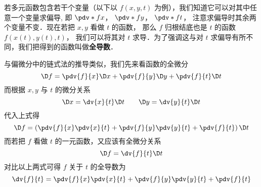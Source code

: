 
若多元函数包含若干个变量（以下以 $f(x,y,t)$ 为例），我们知道它可以对其中任意一个变量求偏导, 即 $\pdv*{f}{x}$，  $\pdv*{f}{y}$，  $\pdv*{f}{t}$， 注意求偏导时其余两个变量不变．现在若把 $x,y$ 看做 $t$ 的函数， 那么 $f$ 归根结底也是 $t$ 的函数 $f(x(t),y(t),t)$， 我们可以将其对 $t$ 求导．为了强调这与对 $t$ 求偏导有所不同，我们把得到的函数叫做\textbf{全导数}．

与偏微分中的链式法的推导类似，我们先来看函数的全微分
\begin{equation}
\D f = \pdv{f}{x}\D x + \pdv{f}{y}\D y + \pdv{f}{t}\D t
\end{equation}
而根据 $x,y$ 与 $t$ 的微分关系
\begin{equation}
\D x = \dv{x}{t}\D t \qquad  \D y = \dv{y}{t}\D t
\end{equation}
代入上式得
\begin{equation}
\D f = \left( \pdv{f}{x}\pdv{x}{t} + \pdv{f}{y}\pdv{y}{t} + \pdv{f}{t} \right)\D t
\end{equation}
而若把 $f$ 看做 $t$ 的一元函数，又应该有全微分关系
\begin{equation}
\D f = \dv{f}{t} \D t
\end{equation}
对比以上两式可得 $f$ 关于 $t$ 的全导数为
\begin{equation}
\dv{f}{t} = \pdv{f}{x}\pdv{x}{t} + \pdv{f}{y}\pdv{y}{t} + \pdv{f}{t}
\end{equation}

